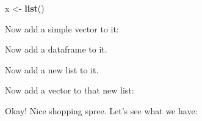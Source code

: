\documentclass[
]{book}
\newenvironment{Shaded}{\begin{snugshade}}{\end{snugshade}}
\newcommand{\DataTypeTok}[1]{\textcolor[rgb]{0.13,0.29,0.53}{#1}}
\newcommand{\DecValTok}[1]{\textcolor[rgb]{0.00,0.00,0.81}{#1}}
\newcommand{\KeywordTok}[1]{\textcolor[rgb]{0.13,0.29,0.53}{\textbf{#1}}}
\newcommand{\NormalTok}[1]{#1}
\newcommand{\OperatorTok}[1]{\textcolor[rgb]{0.81,0.36,0.00}{\textbf{#1}}}
\newcommand{\StringTok}[1]{\textcolor[rgb]{0.31,0.60,0.02}{#1}}
\begin{document}
\begin{Shaded}
\begin{Highlighting}[]
\NormalTok{x <-}\StringTok{ }\KeywordTok{list}\NormalTok{()}
\end{Highlighting}
\end{Shaded}

Now add a simple vector to it:

\begin{Shaded}
\end{Shaded}

Now add a dataframe to it.

\begin{Shaded}
\end{Shaded}

Now add a new list to it.

\begin{Shaded}
\end{Shaded}

Now add a vector to that new list:

\begin{Shaded}
\end{Shaded}

Okay! Nice shopping spree. Let's see what we have:
\end{document}
